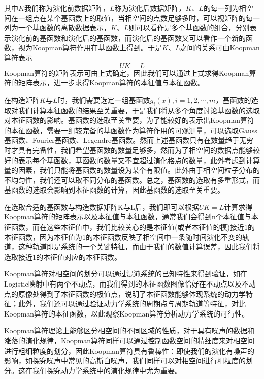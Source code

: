 其中$K$我们称为演化前数据矩阵，$L$称为演化后数据矩阵，$K$、$L$的每一列为相空间在一组点在某个基函数上的取值，当相空间的点数足够多时，可以视矩阵的每一列为一个基函数的离散数据表示，$K$、$L$则可以看作是多个基函数的组合，分别表示演化前的基函数和演化后的基函数，而演化后的基函数又可以看作一个新的函数，视为Koopman算符作用在基函数上得到。于是$K$、$L$之间的关系可由Koopman算符表示
\begin{equation}
    UK=L
    \label{eq:Koop_kl1}
\end{equation}
Koopman算符的矩阵表示可由上式确定，因此我们可以通过上式求得Koopman算符的矩阵表示，进一步求得Koopman算符的本征值与本征函数。

在构造矩阵$K$与$L$时，我们需要选定一组基函数${g_i(x)},i=1,2,\cdots,m$，基函数的选取对我们计算本征函数的结果至关重要，于是我们将从多个角度讨论基函数的选取对本征函数的影响。基函数的选取至关重要，为了能较好的表示出Koopman算符的本征函数，需要一组较完备的基函数作为算符作用的可观测量，可以选取Gauss基函数、Fourier基函数、Legendre基函数。然而上述基函数只有在数量趋于无穷时才具有完备性，我们希望基函数的数量足够多，然而为了相空间的数据点能够较好的表示每个基函数，基函数的数量又不宜超过演化格点的数量，此外考虑到计算量的因素，我们只能将基函数的数量设为某个有限值。此外由于相空间粒子分布的不均匀性，我们还可以取不同分布的基函数。总之，基函数的选取有多重形式，而基函数的选取会影响到本征函数的计算，因此基函数的选取至关重要。

在选取合适的基函数与构造数据矩阵K与L后，我们即可以根据$UK=L$计算求得Koopman算符的矩阵表示以及本征值与本征函数，通常我们会得到n个本征值与本征函数，而在这些本征值中，我们比较关心的是本征值(或者本征值的模)接近1的本征函数，因为本征值为1的本征函数反映了相空间中一条随时间演化不变的轨道，这种轨道即是系统的一个关键特征，而由于我们的数值计算误差，因此我们将选取接近1的本征值对应的本征函数。

Koopman算符对相空间的划分可以通过混沌系统的已知特性来得到验证，如在Logistic映射中有两个不动点，而我们得到的本征函数图像恰好在不动点以及不动点的原像处得到了本征函数的极值点，说明了本征函数能够体现系统的动力学特征；此外，我们还可以通过验证动力学系统的周期点与周期轨道等特征，对比Koopman算符的本征函数，以此观察Koopman算符分析动力学系统的可行性。

Koopman算符理论上能够区分相空间的不同区域的性质\cite{JJY2015Koopman}，对于具有噪声的数据和涨落的演化规律，Koopman算符同样可以通过控制函数空间的精细度来对相空间进行粗细粒度的划分，因此Koopman算符具有鲁棒性：即使我们的演化有噪声的影响，如探究噪声中常见的高斯白噪声，我们同样可以对相空间进行粗粒度的划分。这在我们探究动力学系统中的演化规律中尤为重要。

